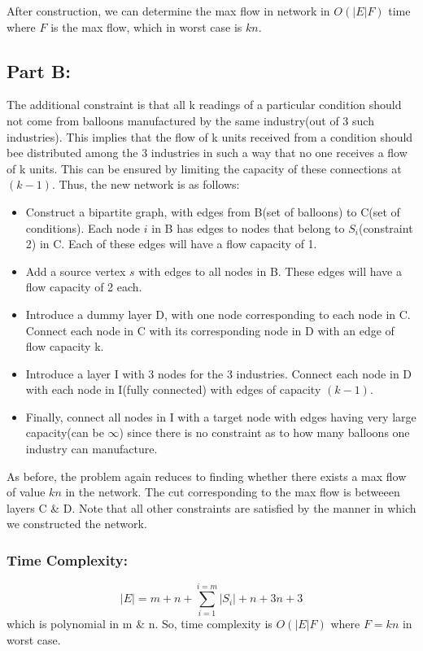 \documentclass{article}
\begin{document}
After construction, we can determine the max flow in network in $O(|E|F)$ time where $F$ is the max flow, which in worst case is $kn$.

\subsection{Part B:}
The additional constraint is that all k readings of a particular condition should not come from balloons manufactured by the same industry(out of 3 such industries). This implies that the flow of k units received from a condition should bee distributed among the 3 industries in such a way that no one receives  a flow of k units. This can be ensured by limiting the capacity of these connections at $(k-1)$. Thus, the new network is as follows:
\begin{itemize}
    \item Construct a bipartite graph, with edges from B(set of balloons) to C(set of conditions). Each node $i$ in B has edges to nodes that belong to $S_i$(constraint 2) in C.
    Each of these edges will have a flow capacity of 1.
    
    \item Add a source vertex $s$ with edges to all nodes in B. These edges will have a flow capacity of 2 each.
    
    \item Introduce a dummy layer D, with one node corresponding to each node in C. Connect each node in C with its corresponding node in D with an edge of flow capacity k.
    
    \item Introduce a layer I with 3 nodes  for the 3 industries. Connect each node in D with each node in I(fully connected) with edges of capacity $(k-1)$.
    
    \item Finally, connect all nodes in I with a target node with edges having very large capacity(can be $\infty$) since there is no constraint as to how many balloons one industry can manufacture.
\end{itemize}

As before, the problem again reduces to finding whether there exists a max flow of value $kn$ in the network. The cut corresponding to the max flow is betweeen layers C \& D. Note that all other constraints are satisfied by the manner in which we constructed the network.
\subsubsection{Time Complexity:}
$$|E|= m + n + \sum_{i=1}^{i=m}|S_i| + n + 3n  + 3$$
which is polynomial in m \& n.
So, time complexity is $O(|E|F)$ where $F = kn$ in worst case.

\pagebreak
\end{document}
